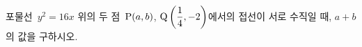 포물선~$y^2=16x$ 위의 두 점~$\mathrm{P}(a{,}\mkern3mu\mathopen{}b)$, $\mathrm{Q}\left(\dfrac{1}{4}{,}\mkern3mu\mathopen{}-2\right)$에서의 접선이 서로 수직일 때, $a+b$의 값을 구하시오.
